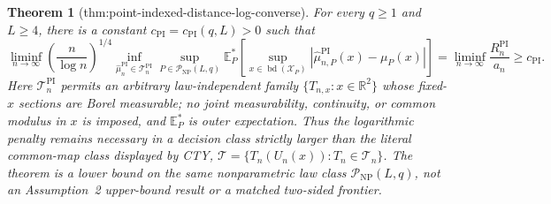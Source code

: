 \documentclass{article}
\newtheorem{theorem}{Theorem}
\begin{document}
\begin{theorem}[thm:point-indexed-distance-log-converse]\label{thm:point-indexed-distance-log-converse}
For every \(q\geq1\) and \(L\geq4\), there is a constant \(c_{\mathrm{PI}}=c_{\mathrm{PI}}(q,L)>0\) such that
\[
 \liminf_{n\to\infty}
 \left(\frac{n}{\log n}\right)^{1/4}
 \inf_{\widehat\mu_n^{\mathrm{PI}}\in\mathcal T_n^{\mathrm{PI}}}
 \sup_{P\in\mathcal P_{\mathrm{NP}}(L,q)}
 \mathbb E_P^*\!\left[
 \sup_{x\in\operatorname{bd}(\mathcal X_P)}
 \left|\widehat\mu_{n,P}^{\mathrm{PI}}(x)-\mu_P(x)\right|
 \right]
 =\liminf_{n\to\infty}\frac{R_n^{\mathrm{PI}}}{a_n}
 \geq c_{\mathrm{PI}}.
\]
Here \(\mathcal T_n^{\mathrm{PI}}\) permits an arbitrary law-independent family \(\{T_{n,x}:x\in\mathbb R^2\}\) whose fixed-\(x\) sections are Borel measurable; no joint measurability, continuity, or common modulus in \(x\) is imposed, and \(\mathbb E_P^*\) is outer expectation.  Thus the logarithmic penalty remains necessary in a decision class strictly larger than the literal common-map class displayed by CTY, \(\mathcal T=\{T_n(U_n(x)):T_n\in\mathcal T_n\}\).  The theorem is a lower bound on the same nonparametric law class \(\mathcal P_{\mathrm{NP}}(L,q)\), not an Assumption~2 upper-bound result or a matched two-sided frontier.
\end{theorem}
\end{document}
